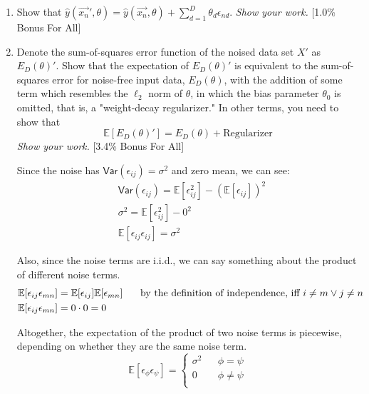 \begin{enumerate}[label=\alph*.]
    \item Show that $\hat{y}(\vec{x_n}',\theta) = \hat{y}(\vec{x_n}, \theta) + \sum^D_{d=1}\theta_d\epsilon_{nd}$. \emph{Show your work.} [1.0\% Bonus For All]

    \item Denote the sum-of-squares error function of the noised data set $X'$ as $E_D(\theta)'$. Show that the expectation of $E_D(\theta)'$ is equivalent to the sum-of-squares error for noise-free input data, $E_D(\theta)$, with the addition of some term which resembles the $\ell_2$ norm of $\theta$, in which the bias parameter $\theta_0$ is omitted, that is, a "weight-decay regularizer." In other terms, you need to show that
    $$\mathbb{E}[E_D(\theta)'] = E_D(\theta) + \text{Regularizer}$$
    \emph{Show your work.} [3.4\% Bonus For All]

    \begin{hintbox}
        Since the noise has $\mathsf{Var}(\epsilon_{ij})=\sigma^2$ and zero mean, we can see: \begin{align*}
            &\mathsf{Var}(\epsilon_{ij}) = \mathbb{E}[\epsilon_{ij}^2] - (\mathbb{E}[\epsilon_{ij}])^2 \\
            &\sigma^2 = \mathbb{E}[\epsilon_{ij}^2] - 0^2 \\
            &\mathbb{E}[\epsilon_{ij}\epsilon_{ij}] = \sigma^2
        \end{align*}

        Also, since the noise terms are i.i.d., we can say something about the product of different noise terms. \begin{align*}
            \mathbb{E}[\epsilon_{ij}\epsilon_{mn}] &= \mathbb{E}[\epsilon_{ij}]\mathbb{E}[\epsilon_{mn}] \hspace{0.5cm}\text{ by the definition of independence, iff }i\neq m \lor j\neq n\\
            \mathbb{E}[\epsilon_{ij}\epsilon_{mn}] &= 0\cdot 0=0
        \end{align*}

        Altogether, the expectation of the product of two noise terms is piecewise, depending on whether they are the same noise term.
  $$
  \mathbb{E}[\epsilon_\phi\epsilon_\psi]=\left\{
  \begin{array}{rcl}
  \sigma^2       &      & \phi = \psi\\
  0     &      & \phi \neq \psi\\
  \end{array} \right.
  $$
    \end{hintbox}
\end{enumerate}